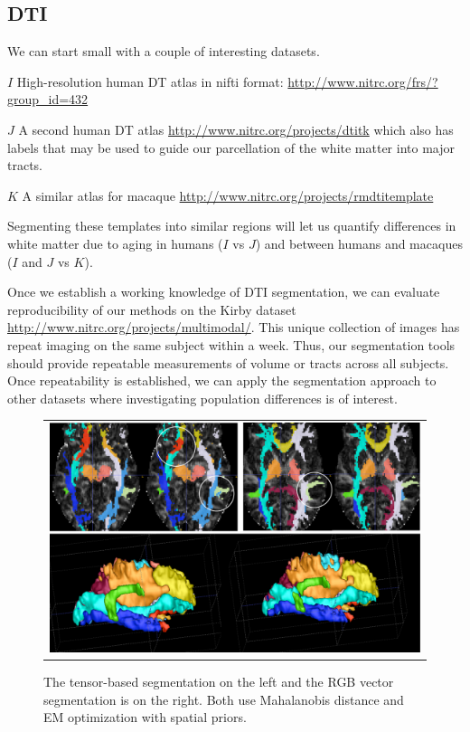 \documentclass[11pt,english]{article}
\begin{document}
\subsection{DTI}
We can start small with a couple of interesting datasets. 

\noindent $I$ High-resolution human DT atlas in nifti format: \url{http://www.nitrc.org/frs/?group_id=432}

\noindent $J$ A second human DT atlas
\url{http://www.nitrc.org/projects/dtitk} which also has labels that
may be used to guide our parcellation of the white matter into major
tracts.

\noindent $K$ A similar atlas for macaque \url{http://www.nitrc.org/projects/rmdtitemplate}

Segmenting these templates into similar regions will let us quantify
differences in white matter due to aging in humans ($I$ vs $J$) and
between humans and macaques ($I$ and $J$ vs $K$).

Once we establish a working knowledge of DTI segmentation, we can
evaluate reproducibility of our methods on the Kirby dataset
\url{http://www.nitrc.org/projects/multimodal/}.  This unique
collection of images has repeat imaging on the same subject within a
week.  Thus, our segmentation tools should provide repeatable
measurements of volume or tracts across all subjects.  Once
repeatability is established, we can apply the segmentation approach
to other datasets where investigating population differences is of
interest.

\begin{figure}
\begin{center}
\begin{tabular}{c}
\includegraphics[width=6in]{Figures/004_vec_vs_dti.pdf}
\end{tabular}
\caption{The tensor-based segmentation on the left and the
  RGB vector segmentation is on the right.  Both use Mahalanobis
  distance and EM optimization with spatial priors.}
\label{fig:example1}
\end{center}
\end{figure}
\end{document}
